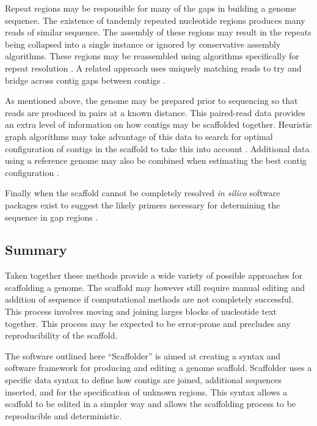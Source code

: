 \documentclass[10pt]{bmc_article}
\newenvironment{bmcformat}{\begin{raggedright}\baselineskip20pt\sloppy\setboolean{publ}{false}}{\end{raggedright}\baselineskip20pt\sloppy}
\begin{document}
\begin{bmcformat}
Repeat regions may be responsible for many of the gaps in building a genome
sequence. The existence of tandemly repeated nucleotide regions produces many
reads of similar sequence. The assembly of these regions may result in the
repeats being collapsed into a single instance or ignored by conservative
assembly algorithms. These regions may be reassembled using algorithms
specifically for repeat resolution \cite{mulyukov2002,koren2010}. A related
approach uses uniquely matching reads to try and bridge across contig gaps
between contigs \cite{tsai2010}. \pb

As mentioned above, the genome may be prepared prior to sequencing so that
reads are produced in pairs at a known distance. This paired-read data
provides an extra level of information on how contigs may be scaffolded
together. Heuristic graph algorithms may take advantage of this data to search
for optimal configuration of contigs in the scaffold to take this into account
\cite{dayarian2010}. Additional data using a reference genome may also be
combined when estimating the best contig configuration \cite{pop2004}. \pb

Finally when the scaffold cannot be completely resolved \emph{in silico}
software packages exist to suggest the likely primers necessary for determining
the sequence in gap regions \cite{gordon2001,nagarajan2010}. \pb

\subsection*{Summary} %

Taken together these methods provide a wide variety of possible approaches for
scaffolding a genome. The scaffold may however still require manual editing
and addition of sequence if computational methods are not completely
successful. This process involves moving and joining larges blocks of
nucleotide text together. This process may be expected to be error-prone and
precludes any reproducibility of the scaffold. \pb

The software outlined here ``Scaffolder'' is aimed at creating a syntax and
software framework for producing and editing a genome scaffold. Scaffolder
uses a specific data syntax to define how contigs are joined, additional
sequences inserted, and for the specification of unknown regions. This syntax
allows a scaffold to be edited in a simpler way and allows the scaffolding
process to be reproducible and deterministic. \pb

\clearpage


\end{bmcformat}
\end{document}
